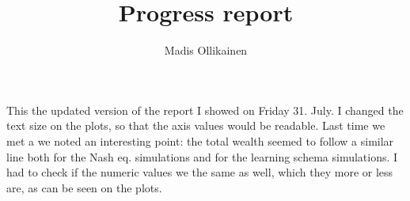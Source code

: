 \documentclass{article}
\author{Madis Ollikainen}
\title{Progress report}
\begin{document}
\maketitle

This the updated version of the report I showed on Friday 31. July. I changed the text size on the plots, so that the axis values would be readable. Last time we met a we noted an interesting point: the total wealth seemed to follow a similar line both for the Nash eq. simulations and for the learning schema simulations. I had to check if the numeric values we the same as well, which they more or less are, as can be seen on the plots.  

\end{document}
